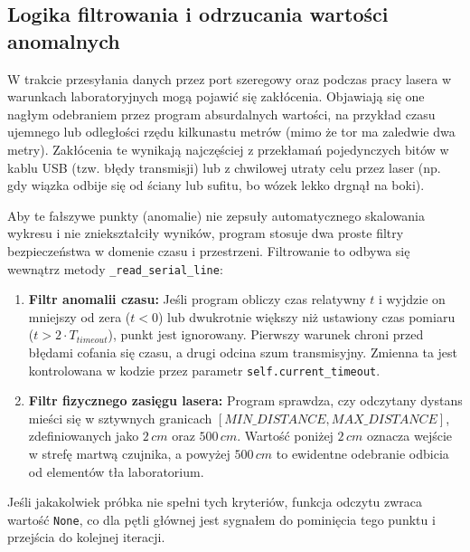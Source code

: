 \documentclass[a4paper,12pt]{article}
\begin{document}

\subsection{Logika filtrowania i odrzucania wartości anomalnych}

\noindent W trakcie przesyłania danych przez port szeregowy oraz podczas pracy lasera w warunkach laboratoryjnych mogą pojawić się zakłócenia. Objawiają się one nagłym odebraniem przez program absurdalnych wartości, na przykład czasu ujemnego lub odległości rzędu kilkunastu metrów (mimo że tor ma zaledwie dwa metry). Zakłócenia te wynikają najczęściej z przekłamań pojedynczych bitów w kablu USB (tzw. błędy transmisji) lub z chwilowej utraty celu przez laser (np. gdy wiązka odbije się od ściany lub sufitu, bo wózek lekko drgnął na boki).

\vspace{0.3cm}
\noindent Aby te fałszywe punkty (anomalie) nie zepsuły automatycznego skalowania wykresu i nie zniekształciły wyników, program stosuje dwa proste filtry bezpieczeństwa w domenie czasu i przestrzeni. Filtrowanie to odbywa się wewnątrz metody \texttt{\_read\_serial\_line}:

\begin{enumerate}
    \item \textbf{Filtr anomalii czasu:} Jeśli program obliczy czas relatywny $t$ i wyjdzie on mniejszy od zera ($t < 0$) lub dwukrotnie większy niż ustawiony czas pomiaru ($t > 2 \cdot T_{{timeout}}$), punkt jest ignorowany. Pierwszy warunek chroni przed błędami cofania się czasu, a drugi odcina szum transmisyjny. Zmienna ta jest kontrolowana w kodzie przez parametr \texttt{self.current\_timeout}.
    \item \textbf{Filtr fizycznego zasięgu lasera:} Program sprawdza, czy odczytany dystans mieści się w sztywnych granicach $[{MIN\_DISTANCE}, {MAX\_DISTANCE}]$, zdefiniowanych jako $2\,{cm}$ oraz $500\,{cm}$. Wartość poniżej $2\,{cm}$ oznacza wejście w strefę martwą czujnika, a powyżej $500\,{cm}$ to ewidentne odebranie odbicia od elementów tła laboratorium.
\end{enumerate}

\noindent Jeśli jakakolwiek próbka nie spełni tych kryteriów, funkcja odczytu zwraca wartość \texttt{None}, co dla pętli głównej jest sygnałem do pominięcia tego punktu i przejścia do kolejnej iteracji.
\end{document}
